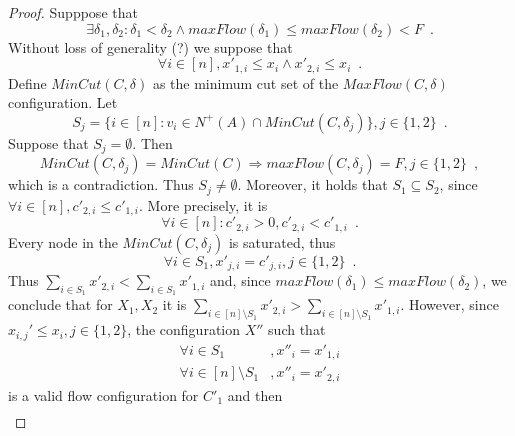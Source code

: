 \begin{proof}
  Supppose that
  \begin{equation*}
    \exists \delta_1, \delta_2 : \delta_1 < \delta_2 \wedge maxFlow\left(\delta_1\right) \leq maxFlow\left(\delta_2\right)
    < F \enspace.
  \end{equation*}
  Without loss of generality (?) we suppose that
  \begin{equation*}
    \forall i \in [n], x'_{1, i} \leq x_i \wedge x'_{2, i} \leq x_i \enspace.
  \end{equation*}
  Define $MinCut\left(C, \delta\right)$ as the minimum cut set of the $MaxFlow\left(C, \delta\right)$ configuration. Let
  \begin{equation*}
    S_j = \{i \in [n] : v_i \in N^{+}\left(A\right) \cap MinCut\left(C, \delta_j\right)\}, j \in \{1, 2\} \enspace.
  \end{equation*}
  Suppose that $S_j = \emptyset$. Then
  \begin{equation*}
    MinCut\left(C, \delta_j\right) = MinCut\left(C\right) \Rightarrow maxFlow\left(C, \delta_j\right) = F, j \in \{1, 2\}
    \enspace,
  \end{equation*}
  which is a contradiction. Thus $S_j \neq \emptyset$.
  Moreover, it holds that $S_1 \subseteq S_2$, since $\forall i \in [n], c'_{2, i} \leq c'_{1, i}$. More precisely, it is
  \begin{equation*}
    \forall i \in [n] : c'_{2, i} > 0, c'_{2, i} < c'_{1, i} \enspace.
  \end{equation*}
  Every node in the $MinCut\left(C, \delta_j\right)$ is saturated, thus
  \begin{equation*}
    \forall i \in S_1, x'_{j, i} = c'_{j, i}, j \in \{1, 2\} \enspace.
  \end{equation*}
  Thus $\sum\limits_{i \in S_1} x'_{2, i} < \sum\limits_{i \in S_1}x'_{1, i}$ and, since $maxFlow(\delta_1) \leq
  maxFlow(\delta_2)$, we conclude that for $X_1, X_2$ it is $\sum\limits_{i \in [n] \setminus S_1}x'_{2, i} >
  \sum\limits_{i \in [n] \setminus S_1}x'_{1, i}$. However, since $x_{i,j}' \leq x_i, j \in \{1,2\}$, the configuration $X''$
  such that
  \begin{align*}
    \forall i \in S_1&, x''_i = x'_{1, i} \\
    \forall i \in [n] \setminus S_1&, x''_i = x'_{2, i}
  \end{align*}
  is a valid flow configuration for $C'_1$ and then
  \begin{equation*}
  \begin{gathered}

\end{gathered}
\end{equation*}
\end{proof}
